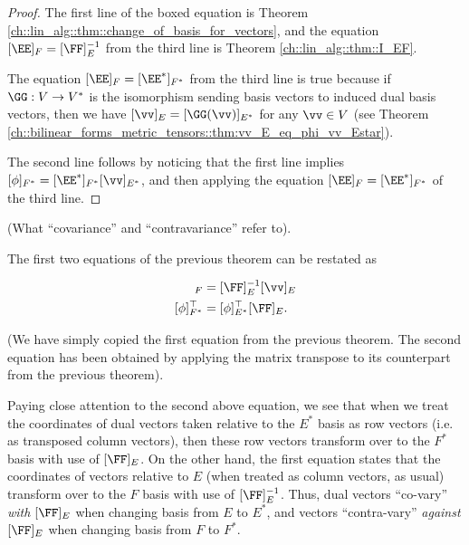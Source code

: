 \begin{proof}
    The first line of the boxed equation is Theorem \ref{ch::lin_alg::thm::change_of_basis_for_vectors}, and the equation $[\EE]_F = [\FF]_E^{-1}$ from the third line is Theorem \ref{ch::lin_alg::thm::I_EF}. 
    
    The equation $[\EE]_F = [\EE^*]_{F^*}$ from the third line is true because  if $\GG:V \rightarrow V^*$ is the isomorphism sending basis vectors to induced dual basis vectors, then we have $[\vv]_E = [\GG(\vv)]_{E^*}$ for any $\vv \in V$ (see Theorem \ref{ch::bilinear_forms_metric_tensors::thm:vv_E_eq_phi_vv_Estar}).
    
    The second line follows by noticing that the first line implies $[\phi]_{F^*} = [\EE^*]_{F^*} [\vv]_{E^*}$, and then applying the equation $[\EE]_F = [\EE^*]_{F^*}$ of the third line.
\end{proof}

\begin{remark}
\label{ch::bilinear_forms_metric_tensors::rmk::covar_contarvar_real_meaning}

    (What ``covariance'' and ``contravariance'' refer to).

    The first two equations of the previous theorem can be restated as
    
    \begin{align*}
        [\vv]_F &= [\FF]_E^{-1} [\vv]_E \\
        [\phi]_{F^*}^\top &= [\phi]_{E^*}^\top [\FF]_E.
    \end{align*}
    
    (We have simply copied the first equation from the previous theorem. The second equation has been obtained by applying the matrix transpose to its counterpart from the previous theorem).
    
    Paying close attention to the second above equation, we see that when we treat the coordinates of dual vectors taken relative to the $E^*$ basis as row vectors (i.e. as transposed column vectors), then these row vectors transform over to the $F^*$ basis with use of $[\FF]_E$. On the other hand, the first equation states that the coordinates of vectors relative to $E$ (when treated as column vectors, as usual) transform over to the $F$ basis with use of $[\FF]_E^{-1}$. Thus, dual vectors ``co-vary'' \textit{with} $[\FF]_E$ when changing basis from $E$ to $E^*$, and vectors ``contra-vary'' \textit{against} $[\FF]_E$ when changing basis from $F$ to $F^*$.
\end{remark}

